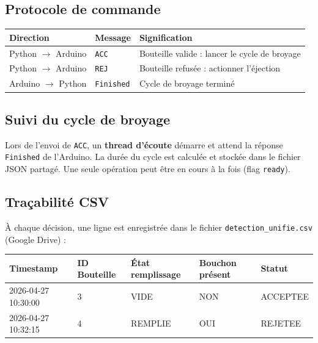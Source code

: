\documentclass[11pt,a4paper]{article}
\begin{document}
\subsection{Protocole de commande}

\begin{center}
\begin{tabular}{p{3.5cm} p{3.5cm} p{6cm}}
\toprule
\textbf{Direction} & \textbf{Message} & \textbf{Signification} \\
\midrule
Python $\to$ Arduino & \texttt{ACC} & Bouteille valide : lancer le cycle de broyage \\
Python $\to$ Arduino & \texttt{REJ} & Bouteille refusée : actionner l'éjection \\
Arduino $\to$ Python & \texttt{Finished} & Cycle de broyage terminé \\
\bottomrule
\end{tabular}
\end{center}

\subsection{Suivi du cycle de broyage}

Lors de l'envoi de \texttt{ACC}, un \textbf{thread d'écoute} démarre et attend
la réponse \texttt{Finished} de l'Arduino. La durée du cycle est calculée et
stockée dans le fichier JSON partagé. Une seule opération peut être en cours à
la fois (flag \texttt{ready}).

\subsection{Traçabilité CSV}

À chaque décision, une ligne est enregistrée dans le fichier
\texttt{detection\_unifie.csv} (Google Drive) :

\begin{center}
\begin{tabular}{lllll}
\toprule
Timestamp & ID Bouteille & État remplissage & Bouchon présent & Statut \\
\midrule
2026-04-27 10:30:00 & 3 & VIDE & NON & ACCEPTEE \\
2026-04-27 10:32:15 & 4 & REMPLIE & OUI & REJETEE \\
\bottomrule
\end{tabular}
\end{center}

\end{document}
